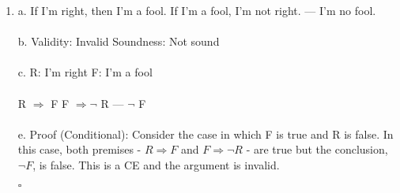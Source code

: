 \documentclass[]{article}
\begin{document}
\begin{enumerate}
    \item a.
    \newline If I'm right, then I'm a fool.
    \newline
    If I'm a fool, I'm not right.
    \newline
    ---
    \newline
    I'm no fool.
    \\\\b.
    Validity: Invalid
    \newline
    Soundness: Not sound
    \\\\c.
    \newline R: I'm right
    \newline F: I'm a fool
    \\\\ R $\Rightarrow$ F
    \newline F $\Rightarrow \neg$ R
    \newline ---
    \newline $\neg$ F
    \\\\e.
    \newline Proof (Conditional):
    \newline Consider the case in which F is true and R is false. In this case, both premises - $R \Rightarrow F$ and $F \Rightarrow \neg R $ - are true but the conclusion, $\neg F$, is false. This is a CE and the argument is invalid.
    \begin{flushright}
    $\square$
    \end{flushright}
    

\end{enumerate}
\end{document}
